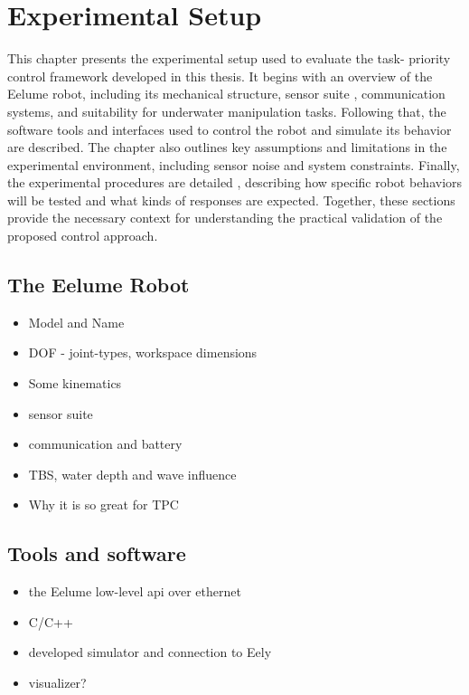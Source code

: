 \chapter{Experimental Setup}

This chapter presents the experimental setup used to evaluate the task-
priority control framework developed in this thesis. It begins with an 
overview of the Eelume robot, including its mechanical structure, sensor suite
, communication systems, and suitability for underwater manipulation tasks. 
Following that, the software tools and interfaces used to control the robot 
and simulate its behavior are described. The chapter also outlines key 
assumptions and limitations in the experimental environment, including sensor 
noise and system constraints. Finally, the experimental procedures are detailed
, describing how specific robot behaviors will be tested and what kinds of 
responses are expected. Together, these sections provide the necessary context 
for understanding the practical validation of the proposed control approach.

\section{The Eelume Robot}

\begin{itemize}
    \item Model and Name
    \item DOF - joint-types, workspace dimensions
    \item Some kinematics
    \item sensor suite
    \item communication and battery
    \item TBS, water depth and wave influence
    \item Why it is so great for TPC
\end{itemize}

\section{Tools and software}
\begin{itemize}
    \item the Eelume low-level api over ethernet
    \item C/C++
    \item developed simulator and connection to Eely
    \item visualizer?
\end{itemize}

